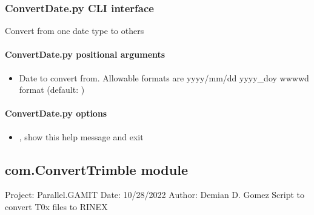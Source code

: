 \documentclass[letterpaper,10pt,english]{sphinxmanual}
\begin{document}
\subsubsection{ConvertDate.py \sphinxhyphen{} CLI interface}
\label{\detokenize{com:ConvertDate.py---CLI-interface}}
\sphinxAtStartPar
Convert from one date type to others

\begin{sphinxVerbatim}[commandchars=\\\{\}]
 \PYG{p}{[}\PYG{p}{]}   
\end{sphinxVerbatim}


\paragraph{ConvertDate.py positional arguments}
\label{\detokenize{com:ConvertDate.py-positional-arguments}}\begin{itemize}
\item {} 
\sphinxAtStartPar
{\hyperref[\detokenize{com:ConvertDate.py-date-to-convert}]{}} \sphinxhyphen{} Date to convert from. Allowable formats are yyyy/mm/dd yyyy\_doy wwww\sphinxhyphen{}d format (default: )

\end{itemize}


\paragraph{ConvertDate.py options}
\label{\detokenize{com:ConvertDate.py-options}}\begin{itemize}
\item {} 
\sphinxAtStartPar
{\hyperref[\detokenize{com:ConvertDate.py--h}]{}}, {\hyperref[\detokenize{com:ConvertDate.py---help}]{}} \sphinxhyphen{} show this help message and exit

\end{itemize}


\subsection{com.ConvertTrimble module}
\label{\detokenize{com:module-com.ConvertTrimble}}\label{\detokenize{com:com-converttrimble-module}}
\sphinxAtStartPar
Project: Parallel.GAMIT
Date: 10/28/2022
Author: Demian D. Gomez
Script to convert T0x files to RINEX
\end{document}
